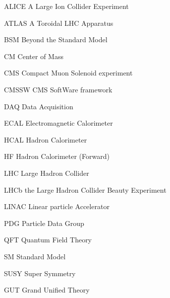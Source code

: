 \begin{theglossary}
\item[ALICE] A Large Ion Collider Experiment
\item[ATLAS] A Toroidal LHC Apparatus
\item[BSM] Beyond the Standard Model
\item[CM] Center of Mass
\item[CMS] Compact Muon Solenoid experiment
\item[CMSSW] CMS SoftWare framework
\item[DAQ] Data Acquisition
\item[ECAL] Electromagnetic Calorimeter
\item[HCAL] Hadron Calorimeter
\item[HF] Hadron Calorimeter (Forward)
\item[LHC] Large Hadron Collider
\item[LHCb] the Large Hadron Collider Beauty Experiment
\item[LINAC] Linear particle Accelerator
\item[PDG] Particle Data Group
\item[QFT] Quantum Field Theory
\item[SM] Standard Model
\item[SUSY] Super Symmetry
\item[GUT] Grand Unified Theory
\end{theglossary}

